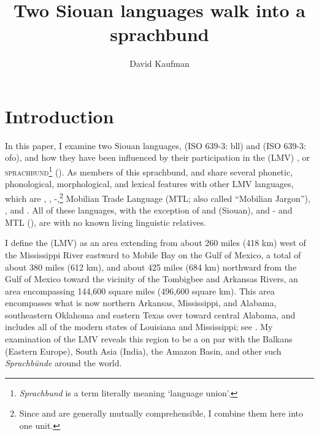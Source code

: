 \documentclass[output=paper]{LSP/langsci}
\author{David Kaufman}
\title{Two {Siouan} languages walk into a sprachbund}
\begin{document}
\section{Introduction}

In this paper, I examine two Siouan languages,  (ISO 639-3: bll) and  (ISO 639-3: ofo), and how they have been influenced by their participation in the  (LMV) , or \textsc{sprachbund}\footnote{\emph{Sprachbund} is a  term literally meaning `language union'.} (\citealt[3]{Kaufman2014}). As members of this sprachbund,  and  share several phonetic, phonological, morphological, and lexical features with other LMV languages, which are , , -,\footnote{Since  and  are generally mutually comprehensible, I combine them here into one unit.} Mobilian Trade Language (MTL; also called ``Mobilian Jargon''), , and . All of these languages, with the exception of  and  (Siouan), and - and MTL (), are  with no known living linguistic relatives. 


I define the  (LMV) as an area extending from about 260 miles (418 km) west of the Mississippi River eastward to Mobile Bay on the Gulf of Mexico, a total of about 380 miles (612 km), and about 425 miles (684 km) northward from the Gulf of Mexico toward the vicinity of the Tombigbee and Arkansas Rivers, an area encompassing 144,600 square miles (496,600 square km). This area encompasses what is now northern Arkansas, Mississippi, and Alabama, southeastern Oklahoma and eastern Texas over toward central Alabama, and includes all of the modern states of Louisiana and Mississippi; see . My examination of the LMV reveals this region to be a  on par with the Balkans (Eastern Europe), South Asia (India), the Amazon Basin, and other such \textit{Sprachbünde} around the world.
\end{document}
